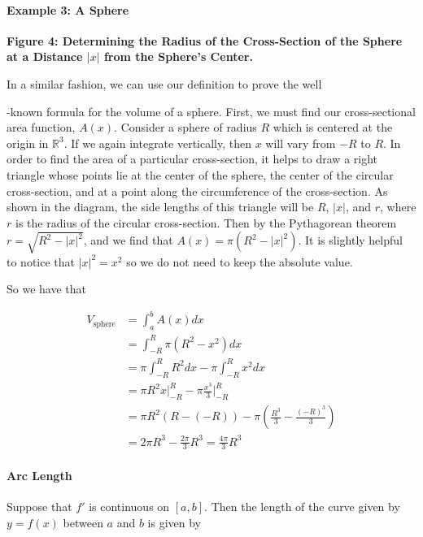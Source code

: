 \paragraph{Example 3: A Sphere}

\textbf{Figure 4: Determining the Radius of the Cross-Section of the Sphere at a Distance $|x|$ from the Sphere's Center.}

In a similar fashion, we can use our definition to prove the well

-known formula for the volume of a sphere. First, we must find our cross-sectional area function, $A(x)$. Consider a sphere of radius $R$ which is centered at the origin in $\mathbb{R}^3$. If we again integrate vertically, then $x$ will vary from $-R$ to $R$. In order to find the area of a particular cross-section, it helps to draw a right triangle whose points lie at the center of the sphere, the center of the circular cross-section, and at a point along the circumference of the cross-section. As shown in the diagram, the side lengths of this triangle will be $R$, $|x|$, and $r$, where $r$ is the radius of the circular cross-section. Then by the Pythagorean theorem $r = \sqrt{R^2 - |x|^2}$, and we find that $A(x) = \pi(R^2 - |x|^2)$. It is slightly helpful to notice that $|x|^2 = x^2$ so we do not need to keep the absolute value.

So we have that

\begin{align}
V_{\mathrm{sphere}} &= \int_a^b A(x) dx\\
&= \int_{-R}^R \pi(R^2 - x^2) dx\\
&= \pi \int_{-R}^R R^2 dx - \pi \int_{-R}^R x^2 dx\\
&= \pi R^2 x \Bigg|_{-R}^R - \pi \frac{x^3}{3} \Bigg|_{-R}^R\\
&= \pi R^2 (R - (-R)) - \pi \left(\frac{R^3}{3} - \frac{(-R)^3}{3}\right)\\
&= 2\pi R^3 - \frac{2\pi}{3} R^3 = \frac{4\pi}{3} R^3
\end{align}

\paragraph{Arc Length}

Suppose that $f'$ is continuous on $[a,b]$. Then the length of the curve given by $y = f(x)$ between $a$ and $b$ is given by

